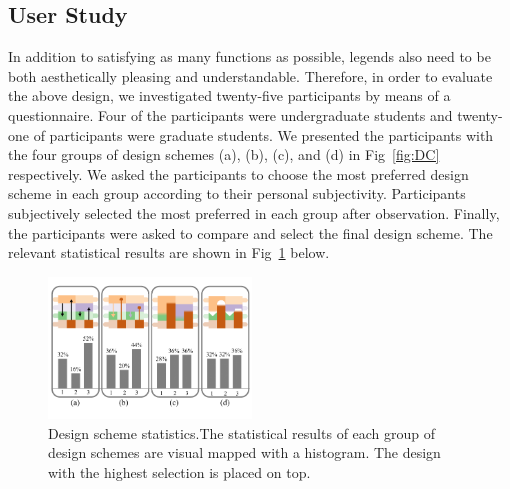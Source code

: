 \documentclass[review,journal]{vgtc}         %
\begin{document}
\subsection{User Study}
\noindent In addition to satisfying as many functions as possible, legends also need to be both aesthetically pleasing and understandable. Therefore, in order to evaluate the above design, we investigated twenty-five participants by means of a questionnaire. Four of the participants were undergraduate students and twenty-one of participants were graduate students. We presented the participants with the four groups of design schemes (a), (b), (c), and (d) in Fig~\ref{fig:DC} respectively. We asked the participants to choose the most preferred design scheme in each group according to their personal subjectivity. Participants subjectively selected the most preferred in each group after observation. Finally, the participants were asked to compare and select the final design scheme. The relevant statistical results are shown in Fig~\ref{fig:sta} below.

\begin{figure}[h]
	\centering
	\vspace{-1.2em}
	\includegraphics[width=0.48\textwidth]{Fig/statistic2.pdf}
	\vspace{-2em}
	\caption{Design scheme statistics.The statistical results of each group of design schemes are visual mapped with a histogram. The design with the highest selection is placed on top.}
	\vspace{-0.5em}
	\label{fig:sta}
\end{figure}
\end{document}
